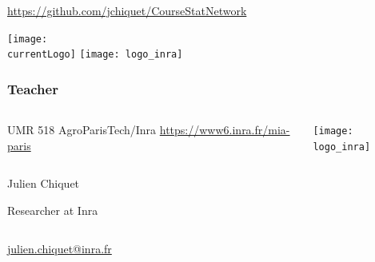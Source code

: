 \documentclass{beamer}\usepackage[]{graphicx}\usepackage[]{color}
\title{\currentCourse}
\subtitle{\huge\currentChapter\normalsize}
\institute{\currentInstitute}
\date{\currentDate}
\def\currentLogo{logo_ensai}
\newcommand{\dotitlepage}{%
  \begin{frame}
    \titlepage
    \vfill
    \begin{center}
        \scriptsize\url{https://github.com/jchiquet/CourseStatNetwork}
    \end{center}
    \vfill
    \texttt{[image: \\currentLogo]}\hfill
    \texttt{[image: logo\_inra]}
  \end{frame}
}
\begin{document}
\dotitlepage


\begin{frame} 
  \frametitle{Teacher}

\begin{columns}
\hspace{1em}\begin{column}{.66\textwidth}
\begin{block}{UMR 518 AgroParisTech/Inra}
\url{https://www6.inra.fr/mia-paris} 
\end{block}
\end{column}
\begin{column}{.33\textwidth}
\texttt{[image: logo\_inra]}
\end{column}
\end{columns}

\vfill

\begin{columns}
  \hspace{1em}
  \hfill
  \begin{column}{.3\paperwidth}
    \alert{\footnotesize Julien Chiquet}\\[1ex]
    
    
    {\tiny Researcher at Inra}
  \end{column}
  
\end{columns}

\hfill

\begin{center}
\url{julien.chiquet@inra.fr}
\end{center}

\end{frame}

% 
% 
\end{document}
